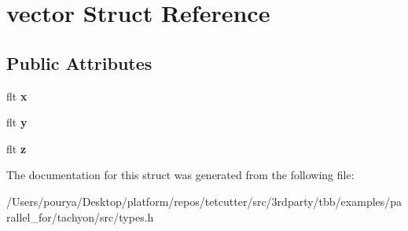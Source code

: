 \hypertarget{structvector}{}\section{vector Struct Reference}
\label{structvector}
\subsection*{Public Attributes}
\begin{DoxyCompactItemize}
\item 
\hypertarget{structvector_a263607df072cdb3dbcf1bdd7a691c40d}{}flt {\bfseries x}\label{structvector_a263607df072cdb3dbcf1bdd7a691c40d}

\item 
\hypertarget{structvector_af7b2a8e82f3ae87f6aa05e910fa4b6c4}{}flt {\bfseries y}\label{structvector_af7b2a8e82f3ae87f6aa05e910fa4b6c4}

\item 
\hypertarget{structvector_a87dbd9efacfcc03f734983d878f631b7}{}flt {\bfseries z}\label{structvector_a87dbd9efacfcc03f734983d878f631b7}

\end{DoxyCompactItemize}


The documentation for this struct was generated from the following file\+:\begin{DoxyCompactItemize}
\item 
/\+Users/pourya/\+Desktop/platform/repos/tetcutter/src/3rdparty/tbb/examples/parallel\+\_\+for/tachyon/src/types.\+h\end{DoxyCompactItemize}
